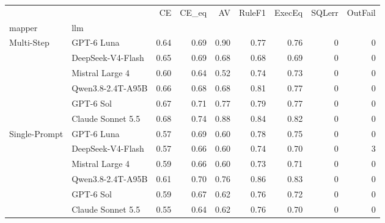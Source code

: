 \begin{tabular}{llrrrrrrr}
\toprule
 &  & CE & CE_eq & AV & RuleF1 & ExecEq & SQLerr & OutFail \\
mapper & llm &  &  &  &  &  &  &  \\
\midrule
\multirow[t]{6}{*}{Multi-Step} & GPT-6 Luna & 0.64 & 0.69 & 0.90 & 0.77 & 0.76 & 0 & 0 \\
 & DeepSeek-V4-Flash & 0.65 & 0.69 & 0.68 & 0.68 & 0.69 & 0 & 0 \\
 & Mistral Large 4 & 0.60 & 0.64 & 0.52 & 0.74 & 0.73 & 0 & 0 \\
 & Qwen3.8-2.4T-A95B & 0.66 & 0.68 & 0.68 & 0.81 & 0.77 & 0 & 0 \\
 & GPT-6 Sol & 0.67 & 0.71 & 0.77 & 0.79 & 0.77 & 0 & 0 \\
 & Claude Sonnet 5.5 & 0.68 & 0.74 & 0.88 & 0.84 & 0.82 & 0 & 0 \\
\cline{1-9}
\multirow[t]{6}{*}{Single-Prompt} & GPT-6 Luna & 0.57 & 0.69 & 0.60 & 0.78 & 0.75 & 0 & 0 \\
 & DeepSeek-V4-Flash & 0.57 & 0.66 & 0.60 & 0.74 & 0.70 & 0 & 3 \\
 & Mistral Large 4 & 0.59 & 0.66 & 0.60 & 0.73 & 0.71 & 0 & 0 \\
 & Qwen3.8-2.4T-A95B & 0.61 & 0.70 & 0.76 & 0.86 & 0.83 & 0 & 0 \\
 & GPT-6 Sol & 0.59 & 0.67 & 0.62 & 0.76 & 0.72 & 0 & 0 \\
 & Claude Sonnet 5.5 & 0.55 & 0.64 & 0.62 & 0.76 & 0.70 & 0 & 0 \\
\cline{1-9}
\bottomrule
\end{tabular}
